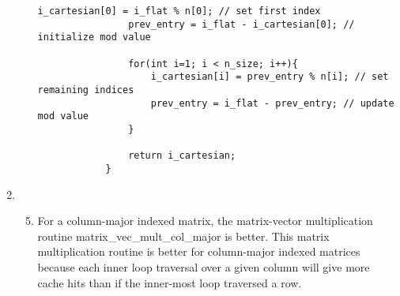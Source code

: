 \documentclass[11pt]{article}
\begin{document}
\begin{enumerate}[leftmargin=0.9in]
\begin{enumerate}[leftmargin=0.3in]
\begin{lstlisting}[caption={}, label={lst:3.3}, style=customCpp]
                i_cartesian[0] = i_flat % n[0]; // set first index
                prev_entry = i_flat - i_cartesian[0]; // initialize mod value
                
                for(int i=1; i < n_size; i++){
                    i_cartesian[i] = prev_entry % n[i]; // set remaining indices 
                    prev_entry = i_flat - prev_entry; // update mod value
                }

                return i_cartesian;
            }
         \end{lstlisting}

   \end{enumerate}

\item %
   \begin{enumerate}[leftmargin=0.3in]
     \setcounter{enumii}{4} 
     \item
       For a column-major indexed matrix, the matrix-vector multiplication routine {\selectfont matrix\_vec\_mult\_col\_major} is better. This matrix multiplication routine is better for column-major indexed matrices because each inner loop traversal over a given column will give more cache hits than if the inner-most loop traversed a row.

   \end{enumerate}


\end{enumerate}
\end{document}
